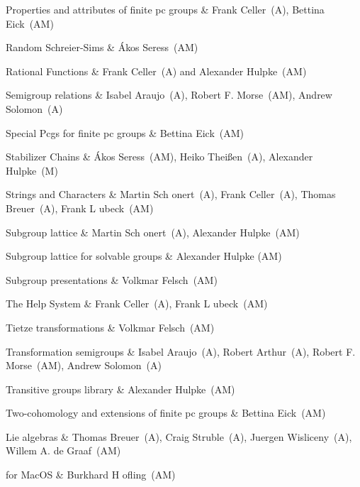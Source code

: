Properties and attributes of finite pc groups &
Frank Celler~(A), Bettina Eick~(AM)

Random Schreier-Sims &
{\'A}kos Seress~(AM)

Rational Functions &
Frank Celler~(A) and Alexander Hulpke~(AM)

Semigroup relations &
Isabel Araujo~(A), Robert F. Morse~(AM), Andrew Solomon~(A)

Special Pcgs for finite pc groups &
Bettina Eick~(AM)

Stabilizer Chains &
{\'A}kos Seress~(AM), Heiko Thei{\ss}en~(A), Alexander Hulpke~(M)

Strings and Characters & 
Martin Sch{ o}nert~(A), Frank Celler~(A), Thomas Breuer~(A), 
Frank L{ u}beck~(AM)

Subgroup lattice &
Martin Sch{ o}nert~(A), Alexander Hulpke~(AM)

Subgroup lattice for solvable groups &
Alexander Hulpke (AM)

Subgroup presentations &
Volkmar Felsch~(AM)

The Help System &
Frank Celler~(A), Frank L{ u}beck~(AM)

Tietze transformations &
Volkmar Felsch~(AM)

Transformation semigroups &
Isabel Araujo~(A), Robert Arthur~(A), Robert F. Morse~(AM), 
Andrew Solomon~(A)

Transitive groups library &
Alexander Hulpke~(AM)

Two-cohomology and extensions of finite pc groups &
Bettina Eick~(AM)

Lie algebras &
Thomas Breuer~(A), Craig Struble~(A), Juergen Wisliceny~(A), Willem A. de Graaf~(AM)

{\GAP} for MacOS & 
Burkhard H{ o}fling~(AM)

\enditems

\hfuzz=0.1pt%


